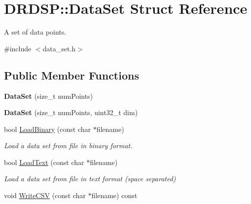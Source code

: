 \hypertarget{struct_d_r_d_s_p_1_1_data_set}{\section{D\-R\-D\-S\-P\-:\-:Data\-Set Struct Reference}
\label{struct_d_r_d_s_p_1_1_data_set}
}


A set of data points.  




{\ttfamily \#include $<$data\-\_\-set.\-h$>$}

\subsection*{Public Member Functions}
\begin{DoxyCompactItemize}
\item 
\hypertarget{struct_d_r_d_s_p_1_1_data_set_a6f0c11d360c6e00083f674b04fbd0986}{{\bfseries Data\-Set} (size\-\_\-t num\-Points)}\label{struct_d_r_d_s_p_1_1_data_set_a6f0c11d360c6e00083f674b04fbd0986}

\item 
\hypertarget{struct_d_r_d_s_p_1_1_data_set_ab1fec22ab532a161837090408b0cfd8c}{{\bfseries Data\-Set} (size\-\_\-t num\-Points, uint32\-\_\-t dim)}\label{struct_d_r_d_s_p_1_1_data_set_ab1fec22ab532a161837090408b0cfd8c}

\item 
\hypertarget{struct_d_r_d_s_p_1_1_data_set_a0ffb95866863d3b2bad35b0c68c6c7f3}{bool \hyperlink{struct_d_r_d_s_p_1_1_data_set_a0ffb95866863d3b2bad35b0c68c6c7f3}{Load\-Binary} (const char $\ast$filename)}\label{struct_d_r_d_s_p_1_1_data_set_a0ffb95866863d3b2bad35b0c68c6c7f3}

\begin{DoxyCompactList}\small\item\em Load a data set from file in binary format. \end{DoxyCompactList}\item 
\hypertarget{struct_d_r_d_s_p_1_1_data_set_a9caf2a2c685f1433028de6d3c11bd758}{bool \hyperlink{struct_d_r_d_s_p_1_1_data_set_a9caf2a2c685f1433028de6d3c11bd758}{Load\-Text} (const char $\ast$filename)}\label{struct_d_r_d_s_p_1_1_data_set_a9caf2a2c685f1433028de6d3c11bd758}

\begin{DoxyCompactList}\small\item\em Load a data set from file in text format (space separated) \end{DoxyCompactList}\item 
\hypertarget{struct_d_r_d_s_p_1_1_data_set_a1d90f86c1fbe0380d91158b1c050c501}{void \hyperlink{struct_d_r_d_s_p_1_1_data_set_a1d90f86c1fbe0380d91158b1c050c501}{Write\-C\-S\-V} (const char $\ast$filename) const }\label{struct_d_r_d_s_p_1_1_data_set_a1d90f86c1fbe0380d91158b1c050c501}


\end{DoxyCompactItemize}
